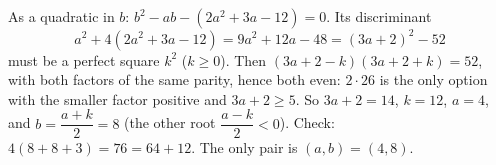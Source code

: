 As a quadratic in $b$: $b^2-ab-(2a^2+3a-12)=0$. Its discriminant
\[
a^2+4(2a^2+3a-12)=9a^2+12a-48=(3a+2)^2-52
\]
must be a perfect square $k^2$ ($k\ge0$). Then $(3a+2-k)(3a+2+k)=52$, with both factors of the same parity, hence both even: $2\cdot26$ is the only option with the smaller factor positive and $3a+2\ge5$. So $3a+2=14$, $k=12$, $a=4$, and $b=\dfrac{a+k}{2}=8$ (the other root $\dfrac{a-k}{2}<0$). Check: $4(8+8+3)=76=64+12$. The only pair is $\boxed{(a,b)=(4,8)}$.
